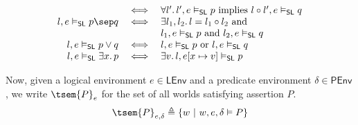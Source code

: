 \begin{defn}
\[\begin{array}{r c l}
		&
		\iff
		&
		\forall l' \ldotp l', e \vDash_\mathsf{SL} p \text{ implies } l \circ l', e \vDash_\mathsf{SL} q
	\\
		l, e \vDash_\mathsf{SL} p \sep q
		&
		\iff
		&
		\exists l_1, l_2 \ldotp l = l_1 \circ l_2 \text{ and } \\
		&& l_1, e \vDash_\mathsf{SL} p \text{ and } l_2, e \vDash_\mathsf{SL} q
	\\
		 l, e \vDash_\mathsf{SL} p \lor q
		 &
		 \iff
		 &
		 l, e \vDash_\mathsf{SL} p \text{ or } l, e \vDash_\mathsf{SL} q
	\\
		l, e \vDash_\mathsf{SL} \exists x \ldotp p
		&
		\iff
		&
		\exists v \ldotp l, e[x \mapsto v] \vDash_\mathsf{SL} p
	\end{array}
	\]
	\endgroup
\end{defn}
Now, given a logical environment $e \in \mathsf{LEnv}$ and a predicate environment $\delta \in \mathsf{PEnv}$, we write $\tsem{P}_e$ for the set of all worlds satisfying assertion $P$.
\[
	\tsem{P}_{e, \delta} \triangleq \{ w\ |\ w, e, \delta \vDash P \}
\]